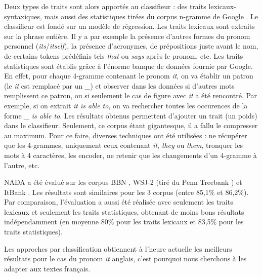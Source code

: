 \documentclass[a4paper,12pt]{article}
\begin{document}
Deux types de traits sont alors apportés au classifieur : des traits lexicaux-syntaxiques, mais aussi des statistiques tirées du corpus n-gramme de Google \citep{google-ngram}. Le classifieur est fondé sur un modèle de régression. Les traits lexicaux sont extraits sur la phrase entière. Il y a par exemple la présence d'autres formes du pronom personnel (\textit{its}/\textit{itself}), la présence d'acronymes, de prépositions juste avant le nom, de certains tokens prédéfinis tels \og{}\textit{that}\fg{} ou \og{}\textit{says}\fg{} après le pronom, etc.
Les traits statistiques sont établis grâce à l'énorme banque de données fournie par Google. En effet, pour chaque 4-gramme contenant le pronom \og{}\textit{it}\fg{}, on va établir un patron (le \og{}\textit{it}\fg{} est remplacé par un \og{}\textit{\_}\fg{}) et observer dans les données si d'autres mots remplissent ce patron, ou si seulement le cas de figure avec \og{}\textit{it}\fg{} a été rencontré. Par exemple, si on extrait \og{}\textit{it is able to}\fg{}, on va rechercher toutes les occurences de la forme \og{}\textit{\_ is able to}\fg{}.
Les résultats obtenus permettent d'ajouter un trait (un poids) dans le classifieur.
Seulement, ce corpus étant gigantesque, il a fallu le compresser au maximum. Pour ce faire, diverses techniques ont été utilisées : ne récupérer que les 4-grammes, uniquement ceux contenant \og{}\textit{it}\fg{}, \og{}\textit{they}\fg{} ou \og{}\textit{them}\fg{}, tronquer les mots à 4 caractères, les encoder, ne retenir que les changements d'un 4-gramme à l'autre, etc.

NADA a été évalué sur les corpus BBN \cite{BBN}, WSJ-2 (tiré du Penn Treebank \cite{Marcus-1993-BLA-972470.972475}) et ItBank \cite{Bergsma08distributionalidentification}. Les résultats sont similaires pour les 3 corpus (entre 85,1\% et 86,2\%). Par comparaison, l'évaluation a aussi été réalisée avec seulement les traits lexicaux et seulement les traits statistiques, obtenant de moins bons résultats indépendamment (en moyenne 80\% pour les traits lexicaux et 83,5\% pour les traits statistiques).

Les approches par classification obtiennent à l'heure actuelle les meilleurs résultats pour le cas du pronom \og \textit{it} \fg{} anglais, c'est pourquoi nous cherchons à les adapter aux textes français.

\color{black}
\end{document}
